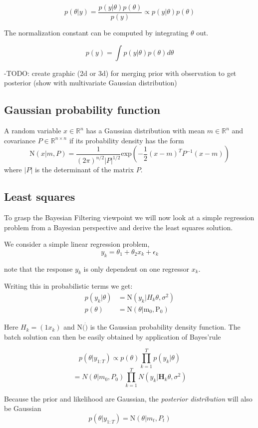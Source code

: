 $$ p(\theta | y) = \frac{p(y | \theta) p(\theta)}{p(y)}
\propto p(y | \theta) p(\theta) $$

The normalization constant can be computed by integrating $\theta$ out.

$$ p(y) = \int p(y | \theta) p(\theta) d\theta $$

-TODO: create graphic (2d or 3d) for merging prior with observation to get
    posterior (show with multivariate Gaussian distribution)

\subsection{Gaussian probability function}
A random variable $x \in \mathbb{R}^n$ has a Gaussian distribution with mean
$m \in \mathbb{R}^n$ and covariance $P \in \mathbb{R}^{n\times n}$ if its
probability density has the form
$$ \text{N}(x | m, P) = \frac{1}{(2\pi)^{n / 2} |P|^{1/2}}
\text{exp} \left( -\frac{1}{2} (x - m)^T P^{-1} (x-m) \right) $$
where $|P|$ is the determinant of the matrix $P$.
    
\subsection{Least squares}
To grasp the Bayesian Filtering viewpoint we will now look
at a simple regression problem from a Bayesian perspective
and derive the least squares solution.

We consider a simple linear regression problem,
$$ y_k = \theta_1 + \theta_2 x_k + \epsilon_k $$

note that the response $y_k$ is only dependent on one regressor $x_k$.

Writing this in probabilistic terms we get:
\begin{align}
  p(y_k | \theta) &= \text{N}(y_k | H_k \theta, \sigma^2) \\
  p(\theta) &= \text{N}(\theta | \text{m}_0, \text{P}_0)
\end{align}

Here $H_k = (1 x_k)$ and N$(\dot)$ is the Gaussian probability density function.
The batch solution can then be easily obtained by application of Bayes'rule

$$ p(\theta | y_{1:T})  \propto p(\theta) \prod^T_{k=1} p (y_k | \theta) $$
$$ = N(\theta | m_0, P_0) \prod^T_{k=1} N(y_k | \textbf{H}_k \theta, \sigma^2) $$

Because the prior and likelihood are Gaussian, the \textit{posterior distribution}
will also be Gaussian
$$ p(\theta | y_{1:T}) = \text{N}(\theta | m_t, P_t) $$

